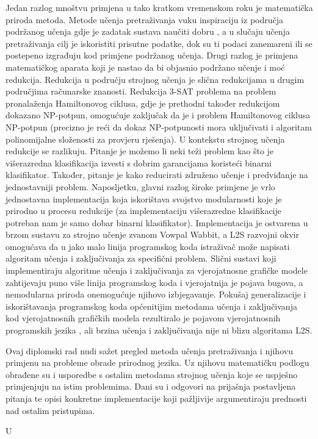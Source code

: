 Jedan razlog mnoštvu primjena u tako kratkom vremenskom roku je matematička
priroda metoda. Metode učenja pretraživanja vuku inspiraciju iz područja
podržanog učenja  gdje je zadatak sustava
naučiti dobru , a u slučaju učenja
pretraživanja cilj je iskoristiti prisutne podatke, dok su ti podaci zanemareni
ili se postepeno izgrađuju kod primjene podržanog učenja. Drugi razlog je
primjena matematičkog aparata koji je nastao da bi objasnio podržano učenje i
moć redukcija. Redukcija u području strojnog učenja je slična redukcijama u
drugim područjima računarske znanosti. Redukcija 3-SAT problema na problem
pronalaženja Hamiltonovog ciklusa, gdje je prethodni također redukcijom dokazano
NP-potpun, omogućuje zaključak da je i problem Hamiltonovog ciklusa NP-potpun
(precizno je reći da dokaz NP-potpunosti mora uključivati i algoritam
polinomijalne složenosti za provjeru rješenja). U kontekstu strojnog učenja
redukcije se razlikuju. Pitanje je možemo li neki teži problem kao što je
višerazredna klasifikacija izvesti s dobrim garancijama koristeći binarni
klasifikator. Također, pitanje je kako reducirati združeno učenje i predviđanje
 na jednostavniji problem. Naposljetku,
glavni razlog široke primjene je vrlo jednostavna implementacija koja
iskorištava svojstvo modularnosti koje je prirodno u procesu redukcije (za
implementaciju višerazredne klasifikacije potreban nam je samo dobar binarni
klasifikator). Implementacija je ostvarena u brzom sustavu za strojno učenje
zvanom Vowpal Wabbit, a \textsc{L2S} razvojni okvir omogućava da u jako malo
linija programskog koda istraživač može napisati algoritam učenja i
zaključivanja za specifični problem. Slični sustavi koji implementiraju
algoritme učenja i zaključivanja za vjerojatnosne grafičke modele zahtijevaju
puno više linija programskog koda i vjerojatnija je pojava bugova, a nemodularna
priroda onemogućuje njihovo izbjegavanje. Pokušaj generalizacije i
iskorištavanja programskog koda općenitijim metodama učenja i zaključivanja kod
vjerojatnosnih grafičkih modela rezultiralo je pojavom vjerojatnosnih
programskih jezika , ali brzina
učenja i zaključivanja nije ni blizu algoritama \textsc{L2S}.

Ovaj diplomski rad nudi sažet pregled metoda učenja pretraživanja i njihovu
primjenu na probleme obrade prirodnog jezika. Uz njihovu matematičku podlogu
obrađene su i usporedbe s ostalim metodama strojnog učenja koje se uspješno
primjenjuju na istim problemima. Dani su i odgovori na prijašnja postavljena
pitanja te opisi konkretne implementacije koji pažljivije argumentiraju
prednosti nad ostalim pristupima.

U 
